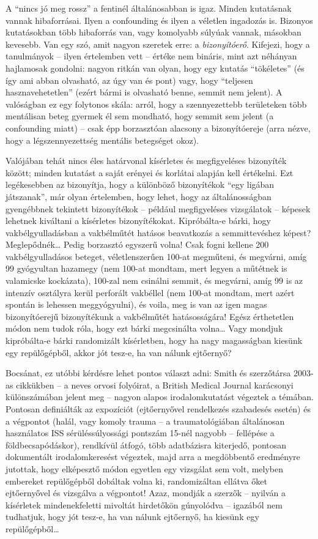 \documentclass[magyar,]{book}
\begin{document}
A \enquote{nincs jó meg rossz} a fentinél általánosabban is igaz. Minden kutatásnak vannak hibaforrásai. Ilyen a confounding és ilyen a véletlen ingadozás is. Bizonyos kutatásokban több hibaforrás van, vagy komolyabb súlyúak vannak, másokban kevesebb. Van egy szó, amit nagyon szeretek erre: a \emph{bizonyítóerő}. Kifejezi, hogy a tanulmányok -- ilyen értelemben vett -- értéke nem bináris, mint azt néhányan hajlamosak gondolni: nagyon ritkán van olyan, hogy egy kutatás \enquote{tökéletes} (és így ami abban olvasható, az úgy van és pont) vagy, hogy \enquote{teljesen hasznavehetetlen} (ezért bármi is olvasható benne, semmit nem jelent). A valóságban ez egy folytonos skála: arról, hogy a szennyezettebb területeken több mentálisan beteg gyermek él sem mondható, hogy semmit sem jelent (a confounding miatt) -- csak épp borzasztóan alacsony a bizonyítóereje (arra nézve, hogy a légszennyezettség mentális betegséget okoz).

Valójában tehát nincs éles határvonal kísérletes és megfigyeléses bizonyíték között; minden kutatást a saját erényei és korlátai alapján kell értékelni. Ezt legékesebben az bizonyítja, hogy a különböző bizonyítékok \enquote{egy ligában játszanak}, már olyan értelemben, hogy lehet, hogy az általánosságban gyengébbnek tekintett bizonyítékok -- például megfigyeléses vizsgálatok -- képesek lehetnek kiváltani a kísérletes bizonyítékokat. Kipróbálta-e bárki, hogy vakbélgyulladásban a vakbélműtét hatásos beavatkozás a semmittevéshez képest? Meglepődnék\ldots{} Pedig borzasztó egyszerű volna! Csak fogni kellene 200 vakbélgyulladásos beteget, véletlenszerűen 100-at megműteni, és megvárni, amíg 99 gyógyultan hazamegy (nem 100-at mondtam, mert legyen a műtétnek is valamicske kockázata), 100-zal nem csinálni semmit, és megvárni, amíg 99 is az intenzív osztályra kerül perforált vakbéllel (nem 100-at mondtam, mert azért spontán is lehessen meggyógyulni), és voila, meg is van az igen magas bizonyítóerejű bizonyítékunk a vakbélműtét hatásosságára! Egész érthetetlen módon nem tudok róla, hogy ezt bárki megcsinálta volna\ldots{} Vagy mondjuk kipróbálta-e bárki randomizált kísérletben, hogy ha nagy magasságban kiesünk egy repülőgépből, akkor jót tesz-e, ha van nálunk ejtőernyő?

Bocsánat, ez utóbbi kérdésre lehet pontos választ adni: Smith és szerzőtársa 2003-as cikkükben -- a neves orvosi folyóirat, a British Medical Journal karácsonyi különszámában jelent meg -- nagyon alapos irodalomkutatást végeztek a témában. Pontosan definiálták az expozíciót (ejtőernyővel rendelkezés szabadesés esetén) és a végpontot (halál, vagy komoly trauma -- a traumatológiában általánosan használatos ISS sérüléssúlyossági pontszám 15-nél nagyobb -- fellépése a földbecsapódáskor), rendkívül átfogó, több adatbázisra kiterjedő, pontosan dokumentált irodalomkeresést végeztek, majd arra a megdöbbentő eredményre jutottak, hogy elképesztő módon egyetlen egy vizsgálat sem volt, melyben embereket repülőgépből dobáltak volna ki, randomizáltan ellátva őket ejtőernyővel és vizsgálva a végpontot! Azaz, mondják a szerzők -- nyilván a kísérletek mindenekfeletti mivoltát hirdetőkön gúnyolódva -- igazából nem tudhatjuk, hogy jót tesz-e, ha van nálunk ejtőernyő, ha kiesünk egy repülőgépből\ldots{}
\end{document}
